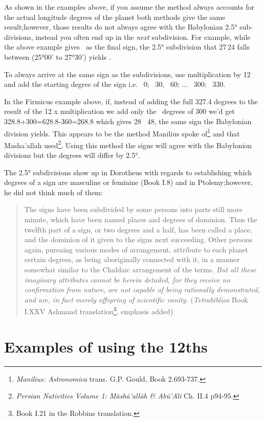 As shown in the examples above, if you assume the method always accounts for the actual longitude degrees of the planet both methods give the same result;however, those results do not always agree with the Babylonian 2.5° sub-divisions, instead you often end up in the \textsl{next} subdivision. For example, while the above example gives \Capricorn\, as the final sign, the 2.5° subdivision that 27\Aquarius\,24 falls between (25°00' to 27°30') yields \Sagittarius.  

To always arrive at the same sign as the subdivisions, use multiplication by 12 and add the starting degree of the sign i.e. \Aries\, 0; \Taurus\ 30, \Gemini\, 60; ... \Aquarius\, 300; \Pisces\ 330. 

In the Firmicus example above, if, instead of adding the full 327.4 degrees to the result of the 12 x multiplication we add only the \Aquarius\, degrees of 300 we'd get 328.8+300=628.8-360=268.8 which gives 28 \Sagittarius\, 48, the same sign the Babylonian division yields. This appears to be the method Manilius spoke of\footnote{\textsl{Manilius: Astronomica} trans. G.P. Gould, Book 2.693-737.} and that Masha'allah used\footnote{\textsl{Persian Nativities Volume 1: Māshā'allāh \& Abū'Ali} Ch. II.4 p94-95.}. Using this method the signs will agree with the Babylonion divisions but the degrees will differ by 2.5°.

The 2.5° subdivisions show up in Dorotheus with regards to establishing which degrees of a sign are masculine or feminine (Book I.8) and in Ptolemy;however, he did not think much of them:
\begin{quote}
The signs have been subdivided by some persons into parts still more minute, which have been named places and degrees of dominion. Thus the twelfth part of a sign, or two degrees and a half, has been called a place, and the dominion of it given to the signs next succeeding. Other persons again, pursuing various modes of arrangement, attribute to each planet certain degrees, as being aboriginally connected with it, in a manner somewhat similar to the Chaldaic arrangement of the terms. \textsl{But all these imaginary attributes cannot be herein detailed, for they receive no confirmation from nature, are not capable of being rationally demonstrated, and are, in fact merely offspring of scientific vanity.} (\textsl{Tetrabiblios} Book I.XXV Ashmand translation\footnote{Book I.21 in the Robbins translation.}, emphasis added)
\end{quote}

\section{Examples of using the 12ths}

